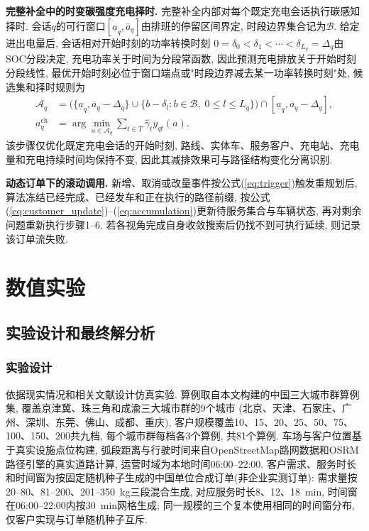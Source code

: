 \documentclass{setp-new}
\begin{document}
\textbf{完整补全中的时变碳强度充电择时.}
完整补全内部对每个既定充电会话执行碳感知择时.
会话$q$的可行窗口$[\underline a_q,\overline a_q]$由排班的停留区间界定,
时段边界集合记为$\mathcal B$.
给定进出电量后, 会话相对开始时刻的功率转换时刻
$0=\delta_0<\delta_1<\cdots<\delta_{L_q}=\Delta_q$由SOC分段决定,
充电功率关于时间为分段常函数,
因此预测充电排放关于开始时刻分段线性,
最优开始时刻必位于窗口端点或"时段边界减去某一功率转换时刻"处,
候选集和择时规则为
\begin{align}
\mathcal A_q&=\bigl(\{\underline a_q,\overline a_q-\Delta_q\}
\cup\{b-\delta_l:b\in\mathcal B,\;0\le l\le L_q\}\bigr)
\cap[\underline a_q,\overline a_q-\Delta_q], \label{eq:charging-candidates}\\
a_q^{\mathrm{ch}}&=\arg\min_{a\in\mathcal A_q}\sum_{t\in T}\widehat\gamma_t y_{qt}(a). \label{eq:charging-rule}
\end{align}
该步骤仅优化既定充电会话的开始时刻,
路线、实体车、服务客户、充电站、充电量和充电持续时间均保持不变,
因此其减排效果可与路径结构变化分离识别.

\textbf{动态订单下的滚动调用.}
新增、取消或改量事件按公式(\ref{eq:trigger})触发重规划后,
算法冻结已经完成、已经发车和正在执行的路径前缀,
按公式(\ref{eq:customer_update})--(\ref{eq:accumulation})更新待服务集合与车辆状态,
再对剩余问题重新执行步骤1--6.
若各视角完成自身收敛搜索后仍找不到可执行延续, 则记录该订单流失败.


\section{数值实验}

\subsection{实验设计和最终解分析}

\subsubsection{实验设计}

依据现实情况和相关文献设计仿真实验.
算例取自本文构建的中国三大城市群算例集,
覆盖京津冀、珠三角和成渝三大城市群的9个城市
(北京、天津、石家庄、广州、深圳、东莞、佛山、成都、重庆),
客户规模覆盖10、15、20、25、50、75、100、150、200共九档,
每个城市群每档各3个算例, 共81个算例.
车场与客户位置基于真实设施点位构建,
弧段距离与行驶时间来自OpenStreetMap路网数据\cite{ref:84}和OSRM路径引擎\cite{ref:85}的真实道路计算,
运营时域为本地时间06:00--22:00.
客户需求、服务时长和时间窗为按固定随机种子生成的中国单位合成订单(非企业实测订单):
需求量按20--80、81--200、201--350~kg三段混合生成,
对应服务时长8、12、18~min, 时间窗在06:00--22:00内按30~min网格生成;
同一规模的三个复本使用相同的时间窗分布, 仅客户实现与订单随机种子互斥.
\end{document}

